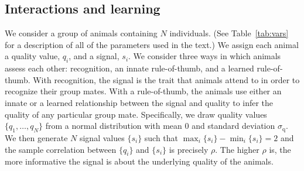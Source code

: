 \subsection{Interactions and learning }
We consider a group of animals containing $N$ individuals. (See Table~\ref{tab:vars} for a description of all of the parameters used in the text.) We assign each animal a quality value, $q_i$, and a signal, $s_i$. We consider three ways in which animals assess each other: recognition, an innate rule-of-thumb, and a learned rule-of-thumb. With recognition, the signal is the trait that animals attend to in order to recognize their group mates. With a rule-of-thumb, the animals use either an innate or a learned relationship between the signal and quality to infer the quality of any particular group mate. Specifically, we draw quality values $\{q_1,\dots,q_N\}$ from a normal distribution with mean $0$ and standard deviation $\sigma_\text{q}$. We then generate $N$ signal values $\{s_i\}$ such that 
$\max_i\{s_i\}-\min_i\{s_i\}=2$ and the sample correlation between $\{q_i\}$ and $\{s_i\}$ is precisely $\rho$. 
The higher $\rho$ is, the more informative the signal is about the underlying quality of the animals.

